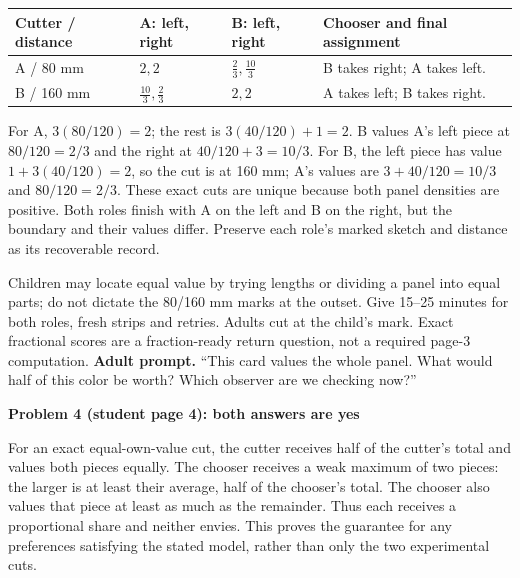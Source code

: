 \documentclass[11pt]{article}
\newcommand{\subhead}[1]{\par\vspace{1mm}\textbf{#1}\par}
\newcommand{\adult}[1]{\textbf{Adult prompt.} #1\par}
\begin{document}
\begin{center}
\end{center}

\begin{tabularx}{\linewidth}{@{}L{29mm}L{28mm}L{33mm}X@{}}\toprule
Cutter / distance & A: left, right & B: left, right & Chooser and final assignment\\\midrule
A / 80 mm & $2,2$ & $\frac23,\frac{10}3$ & B takes right; A takes left.\\
B / 160 mm & $\frac{10}3,\frac23$ & $2,2$ & A takes left; B takes right.\\\bottomrule
\end{tabularx}

For A, $3(80/120)=2$; the rest is $3(40/120)+1=2$. B values A's left piece at $80/120=2/3$ and the right at $40/120+3=10/3$. For B, the left piece has value $1+3(40/120)=2$, so the cut is at 160 mm; A's values are $3+40/120=10/3$ and $80/120=2/3$. These exact cuts are unique because both panel densities are positive. Both roles finish with A on the left and B on the right, but the boundary and their values differ. Preserve each role's marked sketch and distance as its recoverable record.

Children may locate equal value by trying lengths or dividing a panel into equal parts; do not dictate the 80/160 mm marks at the outset. Give 15--25 minutes for both roles, fresh strips and retries. Adults cut at the child's mark. Exact fractional scores are a fraction-ready return question, not a required page-3 computation. \adult{``This card values the whole panel. What would half of this color be worth? Which observer are we checking now?''}

\subhead{Problem 4 (student page 4): both answers are yes}
For an exact equal-own-value cut, the cutter receives half of the cutter's total and values both pieces equally. The chooser receives a weak maximum of two pieces: the larger is at least their average, half of the chooser's total. The chooser also values that piece at least as much as the remainder. Thus each receives a proportional share and neither envies. This proves the guarantee for any preferences satisfying the stated model, rather than only the two experimental cuts.
\end{document}
